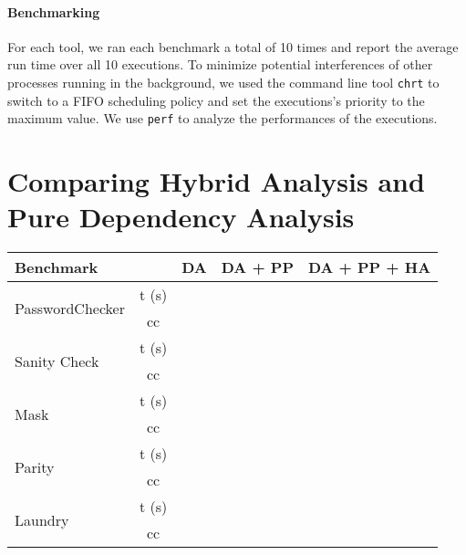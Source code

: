 \paragraph{Benchmarking}
For each tool, we ran each benchmark a total of 10 times and report the average run time over all 10 executions. To minimize potential interferences of other processes running in the background, we used the command line tool \texttt{chrt} to switch to a FIFO scheduling policy and set the executions's priority to the maximum value.
We use \texttt{perf} to analyze the performances of the executions.

\section{Comparing Hybrid Analysis and Pure Dependency Analysis}
\begin{center}
\begin{table}[]
    \begin{tabular}{|l|c|l|l|l|}
    \hline
    \textbf{Benchmark}               & \multicolumn{1}{l|}{}      & DA & DA + PP & DA + PP + HA \\ \hline
    \multirow{2}{*}{PasswordChecker} & \multicolumn{1}{l|}{t (s)} &    &         &               \\ \cline{2-5} 
                                     & cc                         &    &         &               \\ \hline
    \multirow{2}{*}{Sanity Check}    & \multicolumn{1}{l|}{t (s)} &    &         &               \\ \cline{2-5} 
                                     & cc                         &    &         &               \\ \hline
    \multirow{2}{*}{Mask}            & t (s)                      &    &         &               \\ \cline{2-5} 
                                     & cc                         &    &         &               \\ \hline
    \multirow{2}{*}{Parity}          & t (s)                      &    &         &               \\ \cline{2-5} 
                                     & cc                         &    &         &               \\ \hline
    \multirow{2}{*}{Laundry}         & t (s)                      &    &         &               \\ \cline{2-5} 
                                     & cc                         &    &         &               \\ \hline

\end{tabular}
\end{table}
\end{center}
